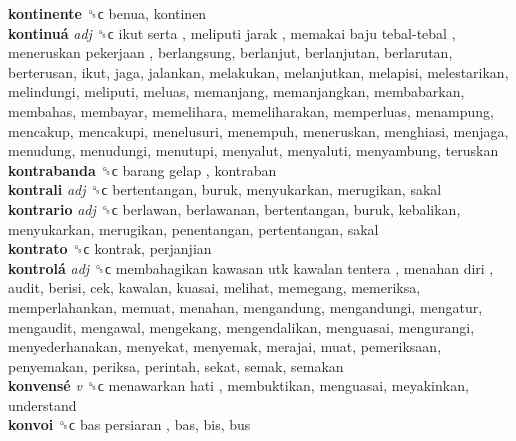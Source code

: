 \textbf{kontinente} ␝ϲ  benua, kontinen  \\
\textbf{kontinuá} \emph{adj}  ␝ϲ   ikut serta ,  meliputi jarak ,  memakai baju tebal-tebal ,  meneruskan pekerjaan , berlangsung, berlanjut, berlanjutan, berlarutan, berterusan, ikut, jaga, jalankan, melakukan, melanjutkan, melapisi, melestarikan, melindungi, meliputi, meluas, memanjang, memanjangkan, membabarkan, membahas, membayar, memelihara, memeliharakan, memperluas, menampung, mencakup, mencakupi, menelusuri, menempuh, meneruskan, menghiasi, menjaga, menudung, menudungi, menutupi, menyalut, menyaluti, menyambung, teruskan  \\
\textbf{kontrabanda} ␝ϲ   barang gelap , kontraban  \\
\textbf{kontrali} \emph{adj}  ␝ϲ  bertentangan, buruk, menyukarkan, merugikan, sakal  \\
\textbf{kontrario} \emph{adj}  ␝ϲ  berlawan, berlawanan, bertentangan, buruk, kebalikan, menyukarkan, merugikan, penentangan, pertentangan, sakal  \\
\textbf{kontrato} ␝ϲ  kontrak, perjanjian  \\
\textbf{kontrolá} \emph{adj}  ␝ϲ   membahagikan kawasan utk kawalan tentera ,  menahan diri , audit, berisi, cek, kawalan, kuasai, melihat, memegang, memeriksa, memperlahankan, memuat, menahan, mengandung, mengandungi, mengatur, mengaudit, mengawal, mengekang, mengendalikan, menguasai, mengurangi, menyederhanakan, menyekat, menyemak, merajai, muat, pemeriksaan, penyemakan, periksa, perintah, sekat, semak, semakan  \\
\textbf{konvensé} \emph{v}  ␝ϲ   menawarkan hati , membuktikan, menguasai, meyakinkan, understand  \\
\textbf{konvoi} ␝ϲ   bas persiaran , bas, bis, bus  \\
